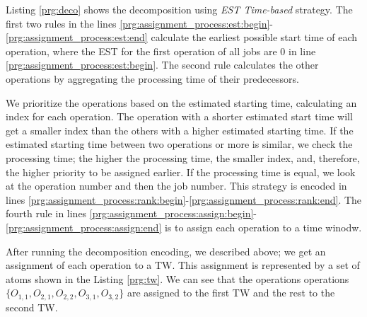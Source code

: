 \documentclass{tlp} %
\begin{document}

Listing \ref{prg:deco} shows the decomposition using \emph{EST Time-based} strategy. The first two rules in the lines \ref{prg:assignment_process:est:begin}-\ref{prg:assignment_process:est:end} calculate the earliest possible start time of each operation, where the EST for the first operation of all jobs are $0$ in line \ref{prg:assignment_process:est:begin}. The second rule calculates the other operations by aggregating the processing time of their predecessors. 

We prioritize the operations based on the estimated starting time, calculating an index for each operation. The operation with a shorter estimated start time will get a smaller index than the others with a higher estimated starting time. If the estimated starting time between two operations or more is similar, we check the processing time; the higher the processing time, the smaller index, and, therefore, the higher priority to be assigned earlier. If the processing time is equal, we look at the operation number and then the job number. This strategy is encoded in lines \ref{prg:assignment_process:rank:begin}-\ref{prg:assignment_process:rank:end}. The fourth rule in lines \ref{prg:assignment_process:assign:begin}-\ref{prg:assignment_process:assign:end} is to assign each operation to a time winodw.



After running the decomposition encoding, we described above; we get an assignment of each operation to a TW. This assignment is represented by a set of atoms shown in the Listing \ref{prg:tw}. We can see that the operations operations $\{ O_{1,1}, O_{2,1}, O_{2,2}, O_{3,1}, O_{3,2} \}$ are assigned to the first TW and the rest to the second TW.


\end{document}
